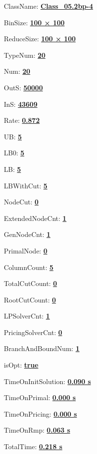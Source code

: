\documentclass[11pt]{article}
\begin{document}
\pagestyle{empty}


ClassName: \underline{\textbf{Class_05.2bp-4}}
\par
BinSize: \underline{\textbf{100 × 100}}
\par
ReduceSize: \underline{\textbf{100 × 100}}
\par
TypeNum: \underline{\textbf{20}}
\par
Num: \underline{\textbf{20}}
\par
OutS: \underline{\textbf{50000}}
\par
InS: \underline{\textbf{43609}}
\par
Rate: \underline{\textbf{0.872}}
\par
UB: \underline{\textbf{5}}
\par
LB0: \underline{\textbf{5}}
\par
LB: \underline{\textbf{5}}
\par
LBWithCut: \underline{\textbf{5}}
\par
NodeCut: \underline{\textbf{0}}
\par
ExtendedNodeCnt: \underline{\textbf{1}}
\par
GenNodeCnt: \underline{\textbf{1}}
\par
PrimalNode: \underline{\textbf{0}}
\par
ColumnCount: \underline{\textbf{5}}
\par
TotalCutCount: \underline{\textbf{0}}
\par
RootCutCount: \underline{\textbf{0}}
\par
LPSolverCnt: \underline{\textbf{1}}
\par
PricingSolverCnt: \underline{\textbf{0}}
\par
BranchAndBoundNum: \underline{\textbf{1}}
\par
isOpt: \underline{\textbf{true}}
\par
TimeOnInitSolution: \underline{\textbf{0.090 s}}
\par
TimeOnPrimal: \underline{\textbf{0.000 s}}
\par
TimeOnPricing: \underline{\textbf{0.000 s}}
\par
TimeOnRmp: \underline{\textbf{0.063 s}}
\par
TotalTime: \underline{\textbf{0.218 s}}
\par
\newpage


\end{document}
